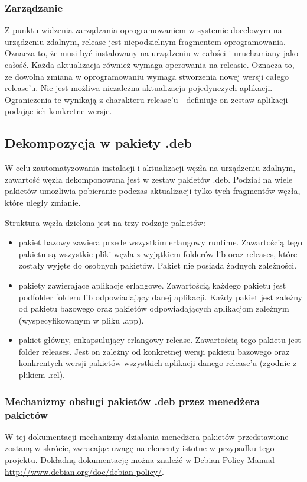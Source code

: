 \documentclass[polish,12pt]{aghthesis}
\begin{document}
\subsubsection{Zarządzanie}

Z punktu widzenia zarządzania oprogramowaniem w systemie docelowym na urządzeniu zdalnym, release jest niepodzielnym fragmentem oprogramowania. Oznacza to, że musi być instalowany na urządzeniu w całości i uruchamiany jako całość. Każda aktualizacja również wymaga operowania na releasie. Oznacza to, ze dowolna zmiana w oprogramowaniu wymaga stworzenia nowej wersji całego release'u. Nie jest możliwa niezależna aktualizacja pojedynczych aplikacji. Ograniczenia te wynikają z charakteru release'u - definiuje on zestaw aplikacji podając ich konkretne wersje.

\subsection{Dekompozycja w pakiety .deb}

W celu zautomatyzowania instalacji i aktualizacji węzła na urządzeniu zdalnym, zawartość węzła dekomponowana jest w zestaw pakietów .deb. Podział na wiele pakietów umożliwia pobieranie podczas aktualizacji tylko tych fragmentów węzła, które uległy zmianie.

Struktura węzła dzielona jest na trzy rodzaje pakietów:
\begin{itemize}
\item pakiet bazowy zawiera przede wszystkim erlangowy runtime. Zawartością tego pakietu są wszystkie pliki węzła z wyjątkiem folderów lib oraz releases, które zostały wyjęte do osobnych pakietów. Pakiet nie posiada żadnych zależności.
\item pakiety zawierające aplikacje erlangowe. Zawartością każdego pakietu jest podfolder folderu lib odpowiadający danej aplikacji. Każdy pakiet jest zależny od pakietu bazowego oraz pakietów odpowiadających aplikacjom zależnym (wyspecyfikowanym w pliku .app).
\item pakiet główny, enkapsulujący erlangowy release. Zawartością tego pakietu jest folder releases. Jest on zależny od konkretnej wersji pakietu bazowego oraz konkrentych wersji pakietów wszystkich aplikacji danego release'u (zgodnie z plikiem .rel).
\end{itemize}

\subsubsection{Mechanizmy obsługi pakietów .deb przez menedżera pakietów}
W tej dokumentacji mechanizmy działania menedżera pakietów przedstawione zostaną w skrócie, zwracając uwagę na elementy istotne w przypadku tego projektu. Dokładną dokumentację można znaleźć w  Debian Policy Manual \url{http://www.debian.org/doc/debian-policy/}.
\end{document}
